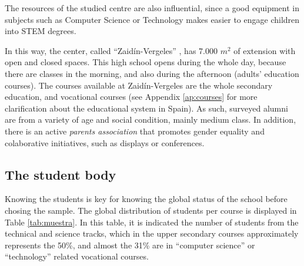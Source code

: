 \documentclass[journal,transmag]{IEEEtran}
\begin{document}
The resources of the studied centre are also influential, since a good equipment in subjects such as Computer Science or Technology makes easier to engage children into STEM degrees.

In this way, the center, called ``Zaid\'{i}n-Vergeles'' \cite{iesZV:2013}, has 7.000 $m^2$ of extension with open and closed spaces. This high school opens during the whole day, because there are classes in the morning, and also during the afternoon (adults' education courses). The courses available at Zaid\'{i}n-Vergeles are the whole secondary education, and vocational courses (see Appendix \ref{ap:courses} for more clarification about the educational system in Spain). As such, surveyed alumni are from a variety of age and social condition, mainly medium class. In addition, there is an active \textit{parents association} that promotes gender equality and colaborative initiatives, such as displays or conferences.

\subsection{The student body}

Knowing the students is key for knowing the global status of the school before chosing the sample. The global distribution of students per course is displayed in Table \ref{tab:muestra}. In this table, it is indicated the number of students from the technical and science tracks, which in the upper secondary courses approximately represents the 50\%, and almost the 31\% are in ``computer science'' or ``technology'' related vocational courses.
\end{document}
